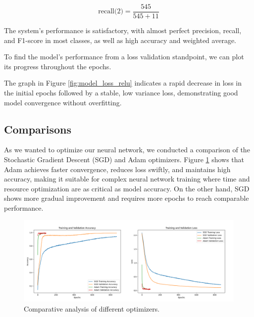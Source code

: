 \begin{equation}
	\text{recall(2)} = \frac{545}{545 + 11}
	\label{eq:recall2}
\end{equation}


The system's performance is satisfactory, with almost perfect precision, recall, and F1-score in most classes, as well as high accuracy and weighted average.




To find the model's performance from a loss validation standpoint, we can plot its progress throughout the epochs.




The graph in Figure \ref{fig:model_loss_relu} indicates a rapid decrease in loss in the initial epochs followed by a stable, low variance loss, demonstrating good model convergence without overfitting.




\subsection{Comparisons}
As we wanted to optimize our neural network, we conducted a comparison of the Stochastic Gradient Descent (SGD) and Adam optimizers. Figure \ref{fig:optimizers} shows that Adam achieves faster convergence, reduces loss swiftly, and maintains high accuracy, making it suitable for complex neural network training where time and resource optimization are as critical as model accuracy. On the other hand, SGD shows more gradual improvement and requires more epochs to reach comparable performance.

\begin{figure}[ht!]
	\centering
	\includegraphics[width=\textwidth]{images/optimizers_comparison.png}
	\caption{Comparative analysis of different optimizers.}
	\label{fig:optimizers}
\end{figure}


